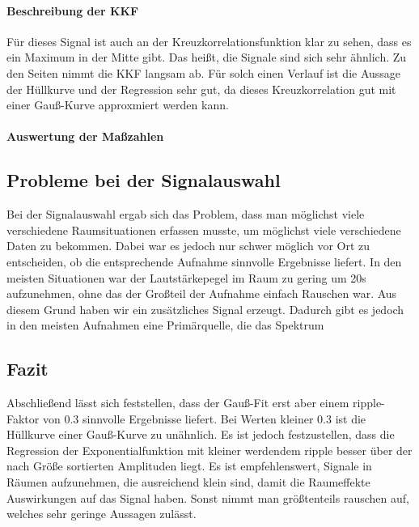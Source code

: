 \paragraph{Beschreibung der KKF}
Für dieses Signal ist auch an der Kreuzkorrelationsfunktion klar zu sehen, dass es ein Maximum in der Mitte gibt. Das heißt, die Signale sind sich sehr ähnlich. Zu den Seiten nimmt die KKF langsam ab. Für solch einen Verlauf ist die Aussage der Hüllkurve und der Regression sehr gut, da dieses Kreuzkorrelation gut mit einer Gauß-Kurve approxmiert werden kann.
\paragraph{Auswertung der Maßzahlen}

\subsection{Probleme bei der Signalauswahl}
Bei der Signalauswahl ergab sich das Problem, dass man möglichst viele verschiedene Raumsituationen erfassen musste, um möglichst viele verschiedene Daten zu bekommen. Dabei war es jedoch nur schwer möglich vor Ort zu entscheiden, ob die entsprechende Aufnahme sinnvolle Ergebnisse liefert.
In den meisten Situationen war der Lautstärkepegel im Raum zu gering um 20s aufzunehmen, ohne das der Großteil der Aufnahme einfach Rauschen war. Aus diesem Grund haben wir ein zusätzliches Signal erzeugt. Dadurch gibt es jedoch in den meisten Aufnahmen eine Primärquelle, die das Spektrum 

\subsection{Fazit}
Abschließend lässt sich feststellen, dass der Gauß-Fit erst aber einem ripple-Faktor von 0.3 sinnvolle Ergebnisse liefert. Bei Werten kleiner 0.3 ist die Hüllkurve einer Gauß-Kurve zu unähnlich. Es ist jedoch festzustellen, dass die Regression der Exponentialfunktion mit kleiner werdendem ripple besser über der nach Größe sortierten Amplituden liegt.
Es ist empfehlenswert, Signale in Räumen aufzunehmen, die ausreichend klein sind, damit die Raumeffekte Auswirkungen auf das Signal haben. Sonst nimmt man größtenteils rauschen auf, welches sehr geringe Aussagen zulässt.
